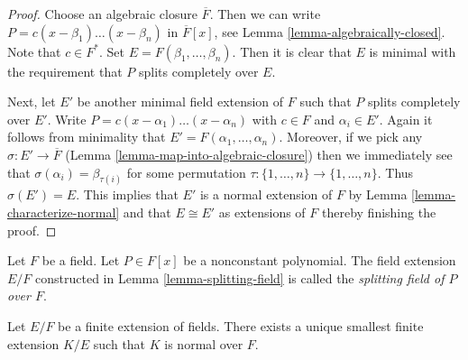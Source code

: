 \begin{proof}
Choose an algebraic closure $\overline{F}$. Then we can write
$P = c (x - \beta_1) \ldots (x - \beta_n)$ in $\overline{F}[x]$, see
Lemma \ref{lemma-algebraically-closed}. Note that $c \in F^*$. Set
$E = F(\beta_1, \ldots, \beta_n)$. Then it is clear that $E$ is
minimal with the requirement that $P$ splits completely over $E$.

\medskip\noindent
Next, let $E'$ be another minimal field extension of $F$ such that
$P$ splits completely over $E'$. Write
$P = c (x - \alpha_1) \ldots (x - \alpha_n)$ with $c \in F$ and
$\alpha_i \in E'$. Again it follows from minimality that
$E' = F(\alpha_1, \ldots, \alpha_n)$. Moreover, if we pick
any $\sigma : E' \to \overline{F}$
(Lemma \ref{lemma-map-into-algebraic-closure})
then we immediately see that $\sigma(\alpha_i) = \beta_{\tau(i)}$
for some permutation $\tau : \{1, \ldots, n\} \to \{1, \ldots, n\}$.
Thus $\sigma(E') = E$. This implies that $E'$ is a normal extension
of $F$ by Lemma \ref{lemma-characterize-normal}
and that $E \cong E'$ as extensions of $F$ thereby finishing the proof.
\end{proof}

\begin{definition}
\label{definition-splitting-field}
Let $F$ be a field. Let $P \in F[x]$ be a nonconstant polynomial.
The field extension $E/F$ constructed in Lemma \ref{lemma-splitting-field}
is called the {\it splitting field of $P$ over $F$}.
\end{definition}

\begin{lemma}
\label{lemma-normal-closure}
Let $E/F$ be a finite extension of fields. There exists a unique
smallest finite extension $K/E$ such that $K$ is normal over $F$.
\end{lemma}

